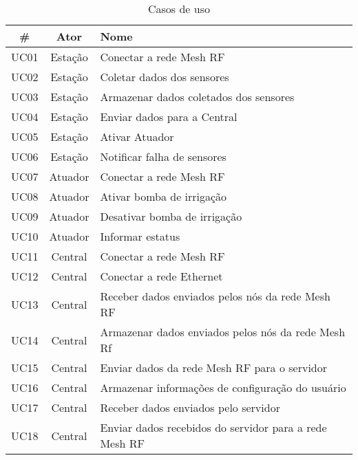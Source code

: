 		\begin{table}[H]
			\caption{Casos de uso}
	        \label{tab:usecase}
			\begin{tabular}{|c|c|l|}
				\hline
					\#   & Ator     & Nome                                                    \\ \hline
					UC01 & Estação  & Conectar a rede Mesh RF                                 \\ \hline
					UC02 & Estação  & Coletar dados dos sensores                              \\ \hline
					UC03 & Estação  & Armazenar dados coletados dos sensores                  \\ \hline
					UC04 & Estação  & Enviar dados para a Central                             \\ \hline
					UC05 & Estação  & Ativar Atuador                                          \\ \hline
					UC06 & Estação  & Notificar falha de sensores                             \\ \hline
					UC07 & Atuador  & Conectar a rede Mesh RF                                 \\ \hline
					UC08 & Atuador  & Ativar bomba de irrigação                               \\ \hline
					UC09 & Atuador  & Desativar bomba de irrigação                            \\ \hline
					UC10 & Atuador  & Informar estatus                                        \\ \hline
					UC11 & Central  & Conectar a rede Mesh RF                                 \\ \hline
					UC12 & Central  & Conectar a rede Ethernet                                \\ \hline
					UC13 & Central  & Receber dados enviados pelos nós da rede Mesh RF        \\ \hline
					UC14 & Central  & Armazenar dados enviados pelos nós da rede Mesh Rf      \\ \hline
					UC15 & Central  & Enviar dados da rede Mesh RF para o servidor            \\ \hline
					UC16 & Central  & Armazenar informações de configuração do usuário        \\ \hline
					UC17 & Central  & Receber dados enviados pelo servidor                    \\ \hline
					UC18 & Central  & Enviar dados recebidos do servidor para a rede Mesh RF  \\ \hline

\end{tabular}
\end{table}
